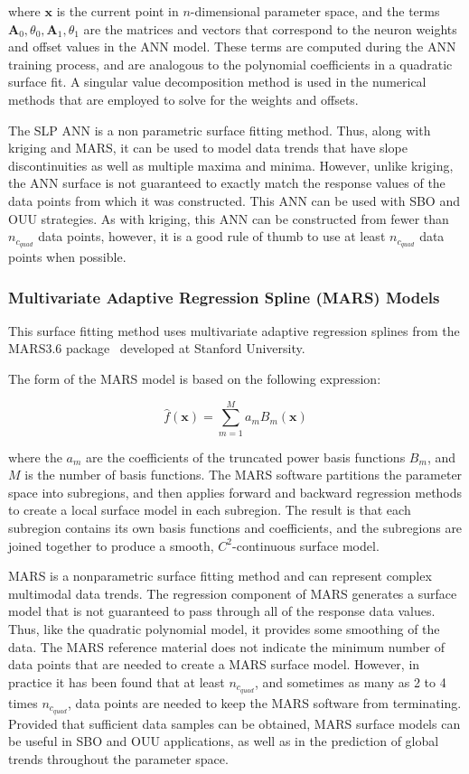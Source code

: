 where $\mathbf{x}$ is the current point in $n$-dimensional parameter
space, and the terms
$\mathbf{A}_{0},\theta_{0},\mathbf{A}_{1},\theta_{1}$ are the matrices
and vectors that correspond to the neuron weights and offset values in
the ANN model. These terms are computed during the ANN training
process, and are analogous to the polynomial coefficients in a
quadratic surface fit. A singular value decomposition method is used
in the numerical methods that are employed to solve for the weights
and offsets.

The SLP ANN is a non parametric surface fitting method. Thus, along
with kriging and MARS, it can be used to model data trends that have
slope discontinuities as well as multiple maxima and minima. However,
unlike kriging, the ANN surface is not guaranteed to exactly match the
response values of the data points from which it was constructed. This
ANN can be used with SBO and OUU strategies. As with kriging, this ANN
can be constructed from fewer than $n_{c_{quad}}$ data points,
however, it is a good rule of thumb to use at least $n_{c_{quad}}$
data points when possible.

\subsubsection{Multivariate Adaptive Regression Spline (MARS) Models}\label{models:surf:mars}

This surface fitting method uses multivariate adaptive regression
splines from the MARS3.6 package~\cite{Fri91} developed at Stanford
University. 

The form of the MARS model is based on the following expression:

\begin{equation}
  \hat{f}(\mathbf{x})=\sum_{m=1}^{M}a_{m}B_{m}(\mathbf{x})
  \label{models:surf:equation10}  
\end{equation}

where the $a_{m}$ are the coefficients of the truncated power basis
functions $B_{m}$, and $M$ is the number of basis functions. The MARS
software partitions the parameter space into subregions, and then
applies forward and backward regression methods to create a local
surface model in each subregion. The result is that each subregion
contains its own basis functions and coefficients, and the subregions
are joined together to produce a smooth, $C^{2}$-continuous surface
model.

MARS is a nonparametric surface fitting method and can represent
complex multimodal data trends. The regression component of MARS
generates a surface model that is not guaranteed to pass through all
of the response data values. Thus, like the quadratic polynomial
model, it provides some smoothing of the data. The MARS reference
material does not indicate the minimum number of data points that are
needed to create a MARS surface model. However, in practice it has
been found that at least $n_{c_{quad}}$, and sometimes as many as 2 to
4 times $n_{c_{quad}}$, data points are needed to keep the MARS
software from terminating.  Provided that sufficient data samples can
be obtained, MARS surface models can be useful in SBO and OUU
applications, as well as in the prediction of global trends throughout
the parameter space.

